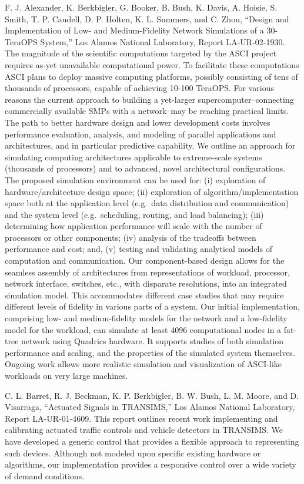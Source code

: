 \documentclass[]{article}
\begin{document}
F. J. Alexander, K. Berkbigler, G. Booker, B. Bush, K. Davis, A. Hoisie,
S. Smith, T. P. Caudell, D. P. Holten, K. L. Summers, and C. Zhou,
``Design and Implementation of Low- and Medium-Fidelity Network
Simulations of a 30-TeraOPS System,'' Los Alamos National Laboratory,
Report LA-UR-02-1930. The magnitude of the scientific computations
targeted by the ASCI project requires as-yet unavailable computational
power. To facilitate these computations ASCI plans to deploy massive
computing platforms, possibly consisting of tens of thousands of
processors, capable of achieving 10-100 TeraOPS. For various reasons the
current approach to building a yet-larger supercomputer--connecting
commercially available SMPs with a network--may be reaching practical
limits. The path to better hardware design and lower development costs
involves performance evaluation, analysis, and modeling of parallel
applications and architectures, and in particular predictive capability.
We outline an approach for simulating computing architectures applicable
to extreme-scale systems (thousands of processors) and to advanced,
novel architectural configurations. The proposed simulation environment
can be used for: (i) exploration of hardware/architecture design space;
(ii) exploration of algorithm/implementation space both at the
application level (e.g.~data distribution and communication) and the
system level (e.g.~scheduling, routing, and load balancing); (iii)
determining how application performance will scale with the number of
processors or other components; (iv) analysis of the tradeoffs between
performance and cost; and, (v) testing and validating analytical models
of computation and communication. Our component-based design allows for
the seamless assembly of architectures from representations of workload,
processor, network interface, switches, etc., with disparate
resolutions, into an integrated simulation model. This accommodates
different case studies that may require different levels of fidelity in
various parts of a system. Our initial implementation, comprising low-
and medium-fidelity models for the network and a low-fidelity model for
the workload, can simulate at least 4096 computational nodes in a
fat-tree network using Quadrics hardware. It supports studies of both
simulation performance and scaling, and the properties of the simulated
system themselves. Ongoing work allows more realistic simulation and
visualization of ASCI-like workloads on very large machines.

C. L. Barret, R. J. Beckman, K. P. Berkbigler, B. W. Bush, L. M. Moore,
and D. Visarraga, ``Actuated Signals in TRANSIMS,'' Los Alamos National
Laboratory, Report LA-UR-01-4609. This report outlines recent work
implementing and calibrating actuated traffic controls and vehicle
detectors in TRANSIMS. We have developed a generic control that provides
a flexible approach to representing such devices. Although not modeled
upon specific existing hardware or algorithms, our implementation
provides a responsive control over a wide variety of demand conditions.
\end{document}
